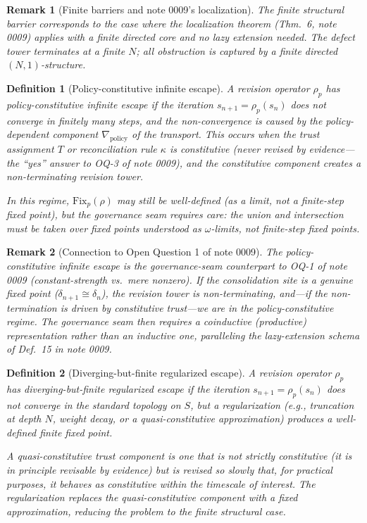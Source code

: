 \documentclass[11pt]{article}
\newtheorem{definition}{Definition}
\newtheorem{remark}{Remark}
\newcommand{\Fix}{\mathrm{Fix}}
\begin{document}
\begin{remark}[Finite barriers and note 0009's localization]
The finite structural barrier corresponds to the case where the localization theorem
(Thm.~6, note 0009) applies with a finite directed core and no lazy extension needed. The
defect tower terminates at a finite $N$; all obstruction is captured by a finite directed
$(N,1)$-structure.
\end{remark}

\begin{definition}[Policy-constitutive infinite escape]
\label{def:policy-infinite}
A revision operator $\rho_p$ has \emph{policy-constitutive infinite escape} if the iteration
$s_{n+1} = \rho_p(s_n)$ does not converge in finitely many steps, and the non-convergence is
caused by the policy-dependent component $\nabla_{\mathrm{policy}}$ of the transport. This
occurs when the trust assignment $T$ or reconciliation rule $\kappa$ is \emph{constitutive}
(never revised by evidence---the ``yes'' answer to OQ-3 of note 0009), and the constitutive
component creates a non-terminating revision tower.

In this regime, $\Fix_p(\rho)$ may still be well-defined (as a limit, not a finite-step
fixed point), but the governance seam requires care: the union and intersection must be taken
over fixed points understood as $\omega$-limits, not finite-step fixed points.
\end{definition}

\begin{remark}[Connection to Open Question 1 of note 0009]
The policy-constitutive infinite escape is the governance-seam counterpart to OQ-1 of note 0009
(constant-strength vs.\ mere nonzero). If the consolidation site is a genuine fixed point
($\delta_{n+1} \cong \delta_n$), the revision tower is non-terminating, and---if the
non-termination is driven by constitutive trust---we are in the policy-constitutive regime.
The governance seam then requires a coinductive (productive) representation rather than an
inductive one, paralleling the lazy-extension schema of Def.~15 in note 0009.
\end{remark}

\begin{definition}[Diverging-but-finite regularized escape]
\label{def:diverging-finite}
A revision operator $\rho_p$ has \emph{diverging-but-finite regularized escape} if the iteration
$s_{n+1} = \rho_p(s_n)$ does not converge in the standard topology on $S$, but a
\emph{regularization} (e.g., truncation at depth $N$, weight decay, or a quasi-constitutive
approximation) produces a well-defined finite fixed point.

A \emph{quasi-constitutive} trust component is one that is not strictly constitutive (it is
in principle revisable by evidence) but is revised so slowly that, for practical purposes,
it behaves as constitutive within the timescale of interest. The regularization replaces the
quasi-constitutive component with a fixed approximation, reducing the problem to the finite
structural case.
\end{definition}
\end{document}
